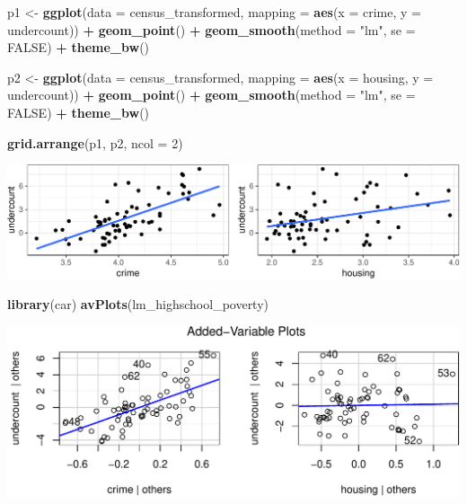 \documentclass[landscape]{article}
\newenvironment{Shaded}{\begin{snugshade}}{\end{snugshade}}
\newcommand{\KeywordTok}[1]{\textcolor[rgb]{0.13,0.29,0.53}{\textbf{#1}}}
\newcommand{\DataTypeTok}[1]{\textcolor[rgb]{0.13,0.29,0.53}{#1}}
\newcommand{\DecValTok}[1]{\textcolor[rgb]{0.00,0.00,0.81}{#1}}
\newcommand{\StringTok}[1]{\textcolor[rgb]{0.31,0.60,0.02}{#1}}
\newcommand{\OtherTok}[1]{\textcolor[rgb]{0.56,0.35,0.01}{#1}}
\newcommand{\OperatorTok}[1]{\textcolor[rgb]{0.81,0.36,0.00}{\textbf{#1}}}
\newcommand{\NormalTok}[1]{#1}
\begin{document}
\newpage

\begin{Shaded}
\begin{Highlighting}[]
\NormalTok{p1 <-}\StringTok{ }\KeywordTok{ggplot}\NormalTok{(}\DataTypeTok{data =}\NormalTok{ census_transformed, }\DataTypeTok{mapping =} \KeywordTok{aes}\NormalTok{(}\DataTypeTok{x =}\NormalTok{ crime, }\DataTypeTok{y =}\NormalTok{ undercount)) }\OperatorTok{+}
\StringTok{  }\KeywordTok{geom_point}\NormalTok{() }\OperatorTok{+}
\StringTok{  }\KeywordTok{geom_smooth}\NormalTok{(}\DataTypeTok{method =} \StringTok{"lm"}\NormalTok{, }\DataTypeTok{se =} \OtherTok{FALSE}\NormalTok{) }\OperatorTok{+}
\StringTok{  }\KeywordTok{theme_bw}\NormalTok{()}

\NormalTok{p2 <-}\StringTok{ }\KeywordTok{ggplot}\NormalTok{(}\DataTypeTok{data =}\NormalTok{ census_transformed, }\DataTypeTok{mapping =} \KeywordTok{aes}\NormalTok{(}\DataTypeTok{x =}\NormalTok{ housing, }\DataTypeTok{y =}\NormalTok{ undercount)) }\OperatorTok{+}
\StringTok{  }\KeywordTok{geom_point}\NormalTok{() }\OperatorTok{+}
\StringTok{  }\KeywordTok{geom_smooth}\NormalTok{(}\DataTypeTok{method =} \StringTok{"lm"}\NormalTok{, }\DataTypeTok{se =} \OtherTok{FALSE}\NormalTok{) }\OperatorTok{+}
\StringTok{  }\KeywordTok{theme_bw}\NormalTok{()}

\KeywordTok{grid.arrange}\NormalTok{(p1, p2, }\DataTypeTok{ncol =} \DecValTok{2}\NormalTok{)}
\end{Highlighting}
\end{Shaded}

\includegraphics{20190422_multicollinearity_files/figure-latex/unnamed-chunk-7-1.pdf}

\begin{Shaded}
\begin{Highlighting}[]
\KeywordTok{library}\NormalTok{(car)}
\KeywordTok{avPlots}\NormalTok{(lm_highschool_poverty)}
\end{Highlighting}
\end{Shaded}

\includegraphics{20190422_multicollinearity_files/figure-latex/unnamed-chunk-8-1.pdf}
\end{document}
